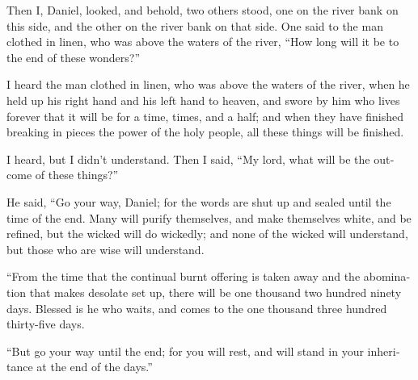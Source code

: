 \begin{paracol}{2}
\begin{otherlanguage}{english}
 Then I, Daniel, looked, and behold, two others stood, one
on the river bank on this side, and the other on the river bank on that
side.  One said to the man clothed in linen, who was above
the waters of the river, ``How long will it be to the end of these
wonders?''

 I heard the man clothed in linen, who was above the
waters of the river, when he held up his right hand and his left hand to
heaven, and swore by him who lives forever that it will be for a time,
times, and a half; and when they have finished breaking in pieces the
power of the holy people, all these things will be finished.

 I heard, but I didn't understand. Then I said, ``My lord,
what will be the outcome of these things?''

 He said, ``Go your way, Daniel; for the words are shut up
and sealed until the time of the end.  Many will purify
themselves, and make themselves white, and be refined, but the wicked
will do wickedly; and none of the wicked will understand, but those who
are wise will understand.

 ``From the time that the continual burnt offering is
taken away and the abomination that makes desolate set up, there will be
one thousand two hundred ninety days.  Blessed is he who
waits, and comes to the one thousand three hundred thirty-five days.

 ``But go your way until the end; for you will rest, and
will stand in your inheritance at the end of the days.''
\end{otherlanguage} \end{paracol}
